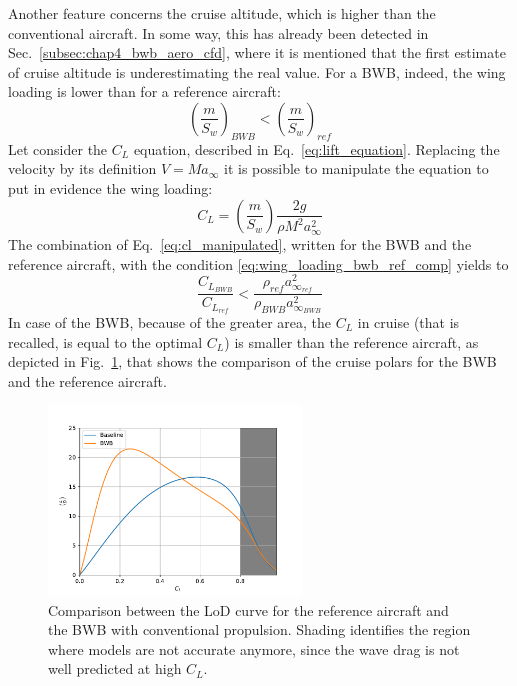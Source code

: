 Another feature concerns the cruise altitude, which is higher than the conventional aircraft. 
In some way, this has already been detected in Sec.~\ref{subsec:chap4_bwb_aero_cfd}, where it is mentioned that the first estimate of cruise altitude is underestimating the real value. 
For a BWB, indeed, the wing loading is lower than for a reference aircraft:
\begin{equation}
	\label{eq:wing_loading_bwb_ref_comp}
	\left(\frac{m}{S_w}\right)_{BWB} < \left(\frac{m}{S_w}\right)_{ref}
\end{equation}
Let consider the $C_L$ equation, described in Eq.~\eqref{eq:lift_equation}. 
Replacing the velocity by its definition $V=Ma_{\infty}$ it is possible to manipulate the equation to put in evidence the wing loading:
\begin{equation}
	\label{eq:cl_manipulated}
	C_L = \left(\frac{m}{S_{w}}\right)\frac{2g}{\rho M^2a_{\infty}^2}
\end{equation} 
The combination of Eq.~\eqref{eq:cl_manipulated}, written for the BWB and the reference aircraft, with the condition \eqref{eq:wing_loading_bwb_ref_comp} yields to 
\begin{equation}
	\label{eq:cl_rewritten}
	\frac{C_{L_{BWB}}}{C_{L_{ref}}} < \frac{\rho_{ref}a_{\infty_{ref}}^2}{\rho_{BWB}a_{\infty_{BWB}}^2}
\end{equation}
In case of the BWB, because of the greater area, the $C_L$ in cruise (that is recalled, is equal to the optimal $C_L$) is smaller than the reference aircraft, as depicted in Fig.~\ref{fig:bwb_polar_comp}, that shows the comparison of the cruise polars for the BWB and the reference aircraft.
\begin{figure}[!h]
	\centering
	\includegraphics[keepaspectratio, width=0.6\textwidth]{images/chap4/bwb_conv_polar_comparison}
	\caption{Comparison between the LoD curve for the reference aircraft and the BWB with conventional propulsion. Shading identifies the region where models are not accurate anymore, since the wave drag is not well predicted at high $C_L$.}
	\label{fig:bwb_polar_comp}
\end{figure}
